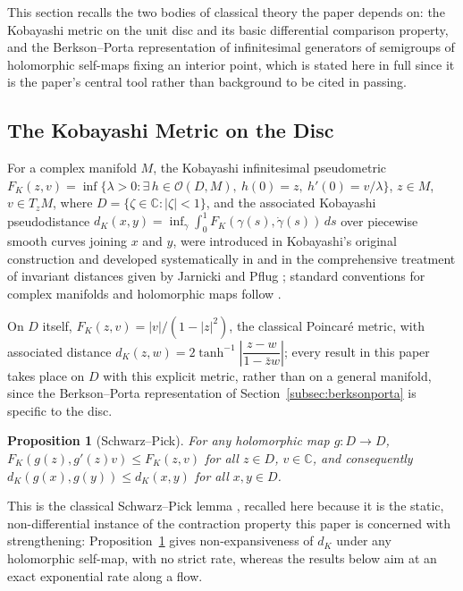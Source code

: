 \documentclass[pdflatex,sn-mathphys-num]{sn-jnl}%
\theoremstyle{thmstyleone}%
\newtheorem{proposition}[theorem]{Proposition}%
\theoremstyle{thmstyletwo}%
\theoremstyle{thmstylethree}%
\begin{document}
This section recalls the two bodies of classical theory the paper depends on: the Kobayashi metric on the unit disc and its basic differential comparison property, and the Berkson--Porta representation of infinitesimal generators of semigroups of holomorphic self-maps fixing an interior point, which is stated here in full since it is the paper's central tool rather than background to be cited in passing.

\subsection{The Kobayashi Metric on the Disc}

For a complex manifold $M$, the Kobayashi infinitesimal pseudometric $F_K(z,v)=\inf\{\lambda>0:\exists\,h\in\mathcal{O}(D,M),\ h(0)=z,\ h'(0)=v/\lambda\}$, $z\in M$, $v\in T_zM$, where $D=\{\zeta\in\mathbb{C}:|\zeta|<1\}$, and the associated Kobayashi pseudodistance $d_K(x,y)=\inf_\gamma\int_0^1F_K(\gamma(s),\dot\gamma(s))\,ds$ over piecewise smooth curves joining $x$ and $y$, were introduced in Kobayashi's original construction \cite{kobayashi1967invariant} and developed systematically in \cite{kobayashi1998hyperbolic} and in the comprehensive treatment of invariant distances given by Jarnicki and Pflug \cite{jarnicki2013invariant}; standard conventions for complex manifolds and holomorphic maps follow \cite{krantz2001function}.

On $D$ itself, $F_K(z,v)=|v|/(1-|z|^2)$, the classical Poincar\'e metric, with associated distance $d_K(z,w)=2\tanh^{-1}\left|\dfrac{z-w}{1-\bar zw}\right|$; every result in this paper takes place on $D$ with this explicit metric, rather than on a general manifold, since the Berkson--Porta representation of Section~\ref{subsec:berksonporta} is specific to the disc.

\begin{proposition}[Schwarz--Pick]
\label{prop:schwarzpick}
For any holomorphic map $g:D\to D$, $F_K(g(z),g'(z)v)\le F_K(z,v)$ for all $z\in D$, $v\in\mathbb{C}$, and consequently $d_K(g(x),g(y))\le d_K(x,y)$ for all $x,y\in D$.
\end{proposition}

This is the classical Schwarz--Pick lemma \cite{ahlfors1979complex}, recalled here because it is the static, non-differential instance of the contraction property this paper is concerned with strengthening: Proposition~\ref{prop:schwarzpick} gives non-expansiveness of $d_K$ under any holomorphic self-map, with no strict rate, whereas the results below aim at an exact exponential rate along a flow.
\end{document}
